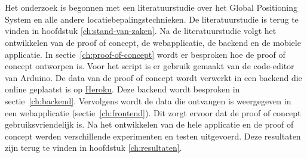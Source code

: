 
\chapter{}
\label{ch:methodologie}

Het onderzoek is begonnen met een literatuurstudie over het Global Positioning System en alle andere locatiebepalingstechnieken. De literatuurstudie is terug te vinden in hoofdstuk \ref{ch:stand-van-zaken}.
\newline
\newline
Na de literatuurstudie volgt het ontwikkelen van de proof of concept, de webapplicatie, de backend en de mobiele applicatie. In sectie~\ref{ch:proof-of-concept} wordt er besproken hoe de proof of concept ontworpen is. Voor het script is er gebruik gemaakt van de code-editor van Arduino. 
\newline
\newline
De data van de proof of concept wordt verwerkt in een backend die online geplaatst is op \href{www.heroku.com}{Heroku}. Deze backend wordt besproken in sectie~\ref{ch:backend}.
\newline
\newline
Vervolgens wordt de data die ontvangen is weergegeven in een webapplicatie (sectie~\ref{ch:frontend}). Dit zorgt ervoor dat de proof of concept gebruiksvriendelijk is. 
\newline
\newline
Na het ontwikkelen van de hele applicatie en de proof of concept werden verschillende experimenten en testen uitgevoerd. Deze resultaten zijn terug te vinden in hoofdstuk \ref{ch:resultaten}.
